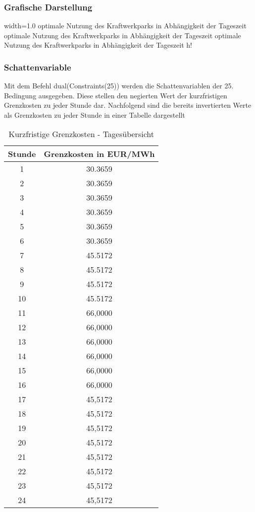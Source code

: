 \documentclass{eegreport}
\begin{document}
\newpage
\subsubsection{Grafische Darstellung}


       {width=1.0\textwidth}
       {optimale Nutzung des Kraftwerkparks in Abhängigkeit der Tageszeit}
       {optimale Nutzung des Kraftwerkparks in Abhängigkeit der Tageszeit}
       {optimale Nutzung des Kraftwerkparks in Abhängigkeit der Tageszeit}
       {h!}  

\newpage
\subsubsection{Schattenvariable}

Mit dem Befehl dual(Constraints(25)) werden die Schattenvariablen der 25. Bedingung ausgegeben. Diese stellen den negierten Wert der kurzfristigen Grenzkosten zu jeder Stunde dar. Nachfolgend sind die bereits invertierten Werte als Grenzkosten zu jeder Stunde in einer Tabelle dargestellt


\begin{table}[h]
\begin{center}
\begin{tabular}{|c|c|}
\hline 
\textbf{Stunde} & \textbf{Grenzkosten in EUR/MWh} \\ 
\hline 
1 & 30.3659 \\ 
\hline 
2 & 30.3659 \\ 
\hline 
3 & 30.3659 \\ 
\hline 
4 & 30.3659 \\ 
\hline 
5 & 30.3659 \\ 
\hline 
6 & 30.3659 \\ 
\hline 
7 & 45.5172 \\ 
\hline 
8 & 45.5172 \\ 
\hline 
9 & 45.5172 \\ 
\hline 
10 & 45.5172 \\ 
\hline 
11 & 66,0000 \\ 
\hline 
12 & 66,0000 \\ 
\hline 
13 & 66,0000 \\ 
\hline 
14 & 66,0000 \\ 
\hline 
15 & 66,0000 \\ 
\hline 
16 & 66,0000 \\ 
\hline 
17 & 45,5172 \\ 
\hline 
18 & 45,5172 \\ 
\hline 
19 & 45,5172 \\ 
\hline 
20 & 45,5172 \\ 
\hline 
21 & 45,5172 \\ 
\hline 
22 & 45,5172 \\ 
\hline 
23 & 45,5172 \\ 
\hline 
24 & 45,5172 \\ 
\hline 
\end{tabular} 
\end{center}
\caption{Kurzfristige Grenzkosten - Tagesübersicht}
\label{eosb}
\end{table}
\end{document}
